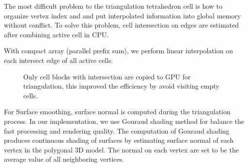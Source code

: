 \documentclass[11pt, b5paper]{report}
\begin{document}
The most difficult problem to the triangulation tetrahedron cell is how
to organize vertex index and and put interpolated information into 
global memory without conflict. To solve this problem, cell intersection
on edges are estimated after combining active cell in CPU.


With compact array (parallel prefix sum), we perform linear interpolation on
each intersect edge of all active cells. 


\begin{figure}[H]
  \centering
  \caption[Collection of active cells are copied to GPU for triangulation]
  {Only cell blocks with intersection are copied to GPU for triangulation, this
    improved the efficiency by avoid visiting empty cells.}
  \label{fig:actcell-tri}
\end{figure}

For Surface smoothing, surface normal is computed during the triangulation 
process. In our implementation, we use Gouraud shading method for balance the
fast processing and rendering quality. The computation of Gouraud shading
produces continuous shading of surfaces by estimating surface normal of each
vertex in the polygonal 3D model. The normal on each vertex are set to be
the average value of all neighboring vertices.
\end{document}
